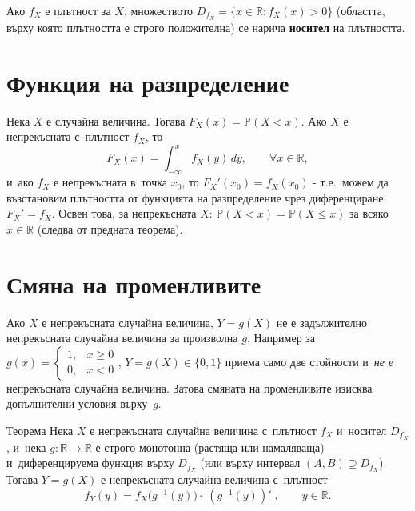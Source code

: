 \begin{defbox}
Ако $f_X$ е плътност за $X$, множеството $D_{f_X} = \{x\in\mathbb R :
f_X(x)>0\}$ (областта, върху която плътността е строго положителна)
се нарича \textbf{носител} на плътността.
\end{defbox}

\section{Функция на разпределение}

\begin{defbox}
Нека $X$ е случайна величина. Тогава $F_X(x) = \mathbb P(X<x)$. Ако
$X$ е непрекъсната с~плътност $f_X$, то
\[
  F_X(x) = \int_{-\infty}^{x} f_X(y)\,dy, \qquad \forall x\in\mathbb R,
\]
и~ако $f_X$ е непрекъсната в~точка $x_0$, то $F_X'(x_0)=f_X(x_0)$ -
т.е.\ можем да възстановим плътността от функцията на разпределение
чрез диференциране: $F_X'=f_X$. Освен това, за непрекъсната $X$:
$\mathbb P(X<x)=\mathbb P(X\le x)$ за всяко $x\in\mathbb R$ (следва
от предната теорема).
\end{defbox}

\section{Смяна на променливите}

\begin{rembox}[Предупреждение]
Ако $X$ е непрекъсната случайна величина, $Y=g(X)$ не е задължително
непрекъсната случайна величина за произволна $g$. Например за
$g(x) = \begin{cases}1,&x\ge0\\0,&x<0\end{cases}$, $Y=g(X)\in\{0,1\}$
приема само две стойности и~\emph{не е} непрекъсната случайна
величина. Затова смяната на променливите изисква допълнителни
условия върху~$g$.
\end{rembox}

\begin{thmbox}[]{Теорема}
Нека $X$ е непрекъсната случайна величина с~плътност $f_X$ и~носител
$D_{f_X}$, и~нека $g:\mathbb R\to\mathbb R$ е строго монотонна
(растяща или намаляваща) и~диференцируема функция върху $D_{f_X}$
(или върху интервал $(A,B)\supseteq D_{f_X}$). Тогава $Y=g(X)$ е
непрекъсната случайна величина с~плътност
\[
  f_Y(y) = f_X\big(g^{-1}(y)\big)\cdot\big|(g^{-1}(y))'\big|, \qquad y\in\mathbb R.
\]
\end{thmbox}

